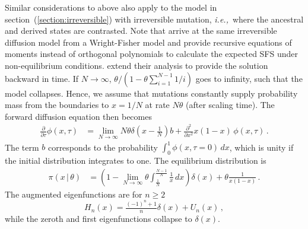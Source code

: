 \documentclass[preprint]{elsarticle}
\newcommand\given{{\,|\,}}
\newcommand\ie{{\it i.e.,}}
\begin{document}
Similar considerations to above also apply to the model in section~(\ref{section:irreversible}) with irreversible mutation, \ie\ where the ancestral and derived states are contrasted. Note that \citet{Evan07} arrive at the same irreversible diffusion model from a Wright-Fisher model and provide recursive equations of moments instead of orthogonal polynomials to calculate the expected SFS under non-equilibrium conditions. \citet{Zivk11} extend their analysis to provide the solution backward in time.  If $N\to\infty$, $\theta/(1-\theta\sum_{i=1}^{N-1}1/i)$ goes to infinity, such that the model collapses. Hence, we assume that mutations constantly supply probability mass from the boundaries to $x=1/N$ at rate $N\theta$ (after scaling time). The forward diffusion equation then becomes
\begin{equation}\label{eq:forw_onebounddrift}
\begin{split}
\frac{\partial}{\partial \tau} \phi(x,\tau)&=
    \lim_{N\to\infty} N\theta \delta(x-\tfrac1N)b+\frac{\partial^2}{\partial x^2}x(1-x)\,\phi(x,\tau)\,.
\end{split}
\end{equation}
The term $b$ corresponds to the probability $\int_0^1\phi(x,\tau=0)\,dx$, which is unity if the initial distribution integrates to one. The equilibrium distribution is 
\begin{equation}
\begin{split}
    \pi(x\given\theta)&=\left(1-\lim_{N\to\infty}\theta \int_{\tfrac1N}^{\tfrac{N-1}N} \frac1x\,dx\right)\delta(x)+\theta\frac{1}{x(1-x)}\,.
\end{split}
\end{equation}
The augmented eigenfunctions are for $n\geq 2$
\begin{equation}\label{eq:forw_onebound_eigen}
    H_n(x)=\tfrac{(-1)^n+1}{n}\delta(x)+U_n(x)\,,
\end{equation}
while the zeroth and first eigenfunctions collapse to $\delta(x)$. %


\end{document}
